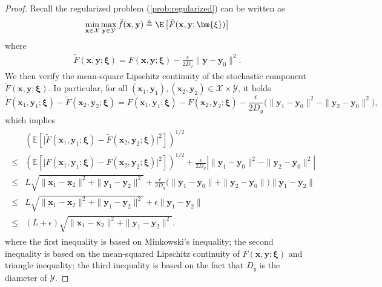 \documentclass[11pt]{article}
\def\vx{\mathbf{x}}
\def\vy{\mathbf{y}}
\def\vxi{\bm{\xi}}
\def\fX{{\mathcal{X}}}
\def\fY{{\mathcal{Y}}}
\begin{document}
\begin{proof}
Recall the regularized problem (\ref{prob:regularized}) can be written as
\begin{align*}
    \min_{\vx\in\fX}\max_{\vy\in\fY}\tilde{f}(\vx,\vy) \triangleq 
    \E\left[\tilde F(\vx,\vy;\vxi)\right]
\end{align*}
where 
\begin{align*}    
\tilde F(\vx,\vy;\vxi) = F(\vx,\vy;\vxi)-\frac{\epsilon}{2D_y}\|\vy-\vy_0\|^2.
\end{align*}
We then verify the mean-square Lipschitz continuity of the stochastic component $\tilde F(\vx,\vy;\vxi)$.
In particular, for all $(\vx_1,\vy_1),(\vx_2,\vy_2)\in \fX\times \fY$, it holds
\[
\tilde{F}(\vx_1,\vy_1;\vxi)-\tilde{F}(\vx_2,\vy_2;\vxi)
=
F(\vx_1,\vy_1;\vxi)-F(\vx_2,\vy_2;\vxi)
-\frac{\epsilon}{2D_y}
\Big(\|\vy_1-\vy_0\|^2-\|\vy_2-\vy_0\|^2\Big),
\]
which implies
\begin{align}\label{eq:tilde-F-L}
\begin{split}
&\left(
\mathbb{E}\left[
\big|\tilde{F}(\vx_1,\vy_1;\vxi)-\tilde{F}(\vx_2,\vy_2;\vxi)\big|^2
\right]
\right)^{1/2} \\
\le&
\left(
\mathbb{E}\left[
\big|F(\vx_1,\vy_1;\vxi)-F(\vx_2,\vy_2;\vxi)\big|^2
\right]
\right)^{1/2}
+
\frac{\epsilon}{2D_y}
\left |
\|\vy_1-\vy_0\|^2-\|\vy_2-\vy_0\|^2
\right |\\
\le&
L\sqrt{\|\vx_1-\vx_2\|^2+\|\vy_1-\vy_2\|^2}
+
\frac{\epsilon}{2D_y}
\big(\|\vy_1-\vy_0\|+\|\vy_2-\vy_0\|\big)\|\vy_1-\vy_2\|\\
\le&
L\sqrt{\|\vx_1-\vx_2\|^2+\|\vy_1-\vy_2\|^2}
+\epsilon \|\vy_1-\vy_2\|\\
\le& (L+\epsilon)\sqrt{\|\vx_1-\vx_2\|^2+\|\vy_1-\vy_2\|^2}.
\end{split}
\end{align}
where the first inequality is based on Minkowski's inequality;
the second inequality is based on the mean-squared
Lipschitz continuity of $F(\vx,\vy;\vxi)$ and triangle inequality; 
the third inequality is based on the fact that $D_y$ is the diameter of $\fY$.


\end{proof}
\end{document}

